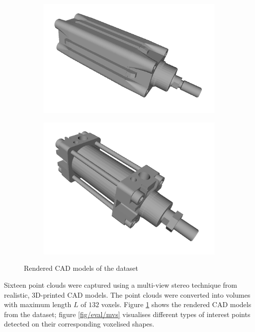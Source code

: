 \begin{figure}
\begin{subfigure}[t]{0.23\linewidth}
		\includegraphics[width=1\linewidth]{./fig/eval/toshiba_piston1.png}
	\end{subfigure}
	\begin{subfigure}[t]{0.23\linewidth} \centering
		\includegraphics[width=1\linewidth]{./fig/eval/toshiba_piston2.png}
	\end{subfigure}
	\caption{Rendered CAD models of the \stereoset dataset} 
	\label{fig/eval/mvscad}
\end{figure}

Sixteen point clouds were captured using a multi-view stereo technique \cite{Vogiatzis2011} from realistic, 3D-printed CAD models. The point clouds were converted into volumes with maximum length $L$ of $132$ voxels. Figure \ref{fig/eval/mvscad} shows the rendered CAD models from the \stereoset dataset; figure \ref{fig/eval/mvs} visualises different types of interest points detected on their corresponding voxelised shapes.

